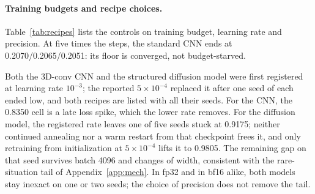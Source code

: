 \documentclass[11pt]{article}
\begin{document}
\paragraph{Training budgets and recipe choices.}
Table~\ref{tab:recipes} lists the controls on training budget, learning rate and precision. At five times the steps, the standard CNN ends at 0.2070/0.2065/0.2051: its floor is converged, not budget-starved.

Both the 3D-conv CNN and the structured diffusion model were first registered at learning rate $10^{-3}$; the reported $5\times10^{-4}$ replaced it after one seed of each ended low, and both recipes are listed with all their seeds. For the CNN, the 0.8350 cell is a late loss spike, which the lower rate removes. For the diffusion model, the registered rate leaves one of five seeds stuck at 0.9175; neither continued annealing nor a warm restart from that checkpoint frees it, and only retraining from initialization at $5\times10^{-4}$ lifts it to 0.9805. The remaining gap on that seed survives batch 4096 and changes of width, consistent with the rare-situation tail of Appendix~\ref{app:mech}. In fp32 and in bf16 alike, both models stay inexact on one or two seeds; the choice of precision does not remove the tail.

\begin{table}[t]
\centering
\caption{\textbf{Training budgets and recipe choices.} Strict L3 SeqAcc (fraction) at the final step on EMA weights, one value per listed seed. The second column lists every difference from the model's row in Table~\ref{tab:main}; indented rows modify the nearest unindented row above them.}
\label{tab:recipes}
\small
{}
\end{table}
\end{document}
